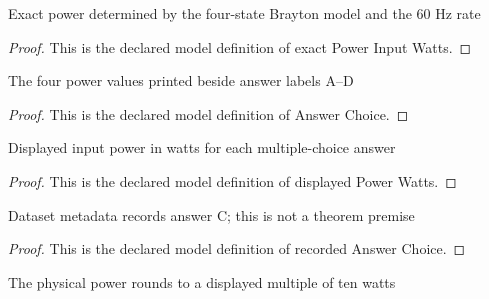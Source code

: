 \begin{definition}
  \label{def:physics:phyx-mini-0481:phyxminiproblems-problemphyxmini0481-exactpowerinputwatts}
  Exact power determined by the four-state Brayton model and the 60 Hz rate
\end{definition}
\begin{proof}
  This is the declared model definition of exact Power Input Watts.
\end{proof}
\begin{definition}
  \label{def:physics:phyx-mini-0481:phyxminiproblems-problemphyxmini0481-answerchoice}
  The four power values printed beside answer labels A--D
\end{definition}
\begin{proof}
  This is the declared model definition of Answer Choice.
\end{proof}
\begin{definition}
  \label{def:physics:phyx-mini-0481:phyxminiproblems-problemphyxmini0481-answerchoice-displayedpowerwatts}
  Displayed input power in watts for each multiple-choice answer
\end{definition}
\begin{proof}
  This is the declared model definition of displayed Power Watts.
\end{proof}
\begin{definition}
  \label{def:physics:phyx-mini-0481:phyxminiproblems-problemphyxmini0481-recordedanswerchoice}
  Dataset metadata records answer C; this is not a theorem premise
\end{definition}
\begin{proof}
  This is the declared model definition of recorded Answer Choice.
\end{proof}
\begin{definition}
  \label{def:physics:phyx-mini-0481:phyxminiproblems-problemphyxmini0481-roundstodisplayedtenwatts}
  The physical power rounds to a displayed multiple of ten watts
\end{definition}
